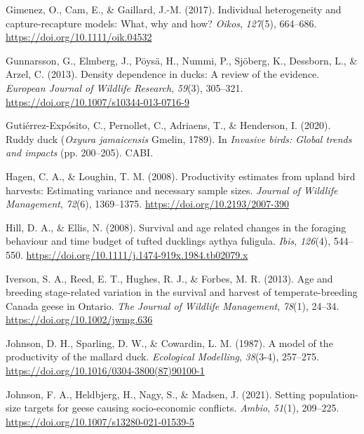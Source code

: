 \documentclass[
  english,
]{article}
\newlength{\cslhangindent}
\newlength{\cslentryspacingunit} %
\newenvironment{CSLReferences}[2] %
 {%
  \setlength{\parindent}{0pt}
  \ifodd #1
  \let\oldpar\par
  \def\par{\hangindent=\cslhangindent\oldpar}
  \fi
  \setlength{\parskip}{#2\cslentryspacingunit}
 }%
 {}
\begin{document}
\begin{CSLReferences}{1}{0}
\leavevmode{}%
Gimenez, O., Cam, E., \& Gaillard, J.-M. (2017). Individual heterogeneity and capture-recapture models: What, why and how? \emph{Oikos}, \emph{127}(5), 664--686. \url{https://doi.org/10.1111/oik.04532}

\leavevmode{}%
Gunnarsson, G., Elmberg, J., Pöysä, H., Nummi, P., Sjöberg, K., Dessborn, L., \& Arzel, C. (2013). Density dependence in ducks: A review of the evidence. \emph{European Journal of Wildlife Research}, \emph{59}(3), 305--321. \url{https://doi.org/10.1007/s10344-013-0716-9}

\leavevmode{}%
Gutiérrez-Expósito, C., Pernollet, C., Adriaens, T., \& Henderson, I. (2020). Ruddy duck (\emph{{O}xyura jamaicensis} {G}melin, 1789). In \emph{Invasive birds: Global trends and impacts} (pp. 200--205). {CABI}.

\leavevmode{}%
Hagen, C. A., \& Loughin, T. M. (2008). Productivity estimates from upland bird harvests: Estimating variance and necessary sample sizes. \emph{Journal of Wildlife Management}, \emph{72}(6), 1369--1375. \url{https://doi.org/10.2193/2007-390}

\leavevmode{}%
Hill, D. A., \& Ellis, N. (2008). Survival and age related changes in the foraging behaviour and time budget of tufted ducklings aythya fuligula. \emph{Ibis}, \emph{126}(4), 544--550. \url{https://doi.org/10.1111/j.1474-919x.1984.tb02079.x}

\leavevmode{}%
Iverson, S. A., Reed, E. T., Hughes, R. J., \& Forbes, M. R. (2013). Age and breeding stage-related variation in the survival and harvest of temperate-breeding {C}anada geese in {O}ntario. \emph{The Journal of Wildlife Management}, \emph{78}(1), 24--34. \url{https://doi.org/10.1002/jwmg.636}

\leavevmode{}%
Johnson, D. H., Sparling, D. W., \& Cowardin, L. M. (1987). A model of the productivity of the mallard duck. \emph{Ecological Modelling}, \emph{38}(3-4), 257--275. \url{https://doi.org/10.1016/0304-3800(87)90100-1}

\leavevmode{}%
Johnson, F. A., Heldbjerg, H., Nagy, S., \& Madsen, J. (2021). Setting population-size targets for geese causing socio-economic conflicts. \emph{Ambio}, \emph{51}(1), 209--225. \url{https://doi.org/10.1007/s13280-021-01539-5}


\end{CSLReferences}
\end{document}
